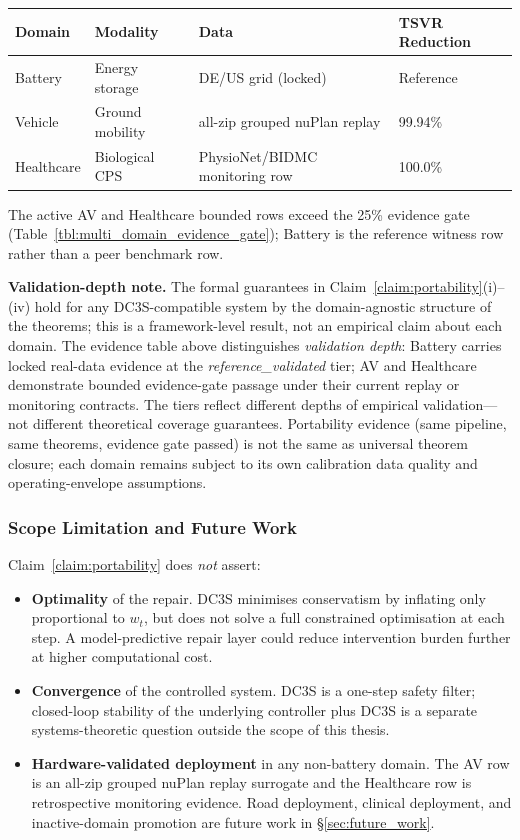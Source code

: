 \begin{center}
\begin{tabular}{llll}
\toprule
\textbf{Domain} & \textbf{Modality} & \textbf{Data} & \textbf{TSVR Reduction} \\
\midrule
Battery  & Energy storage & DE/US grid (locked) & Reference \\
Vehicle  & Ground mobility & all-zip grouped nuPlan replay & 99.94\% \\
Healthcare & Biological CPS & PhysioNet/BIDMC monitoring row & 100.0\% \\
\bottomrule
\end{tabular}
\end{center}

The active AV and Healthcare bounded rows exceed the 25\% evidence gate
(Table~\ref{tbl:multi_domain_evidence_gate}); Battery is the reference witness
row rather than a peer benchmark row.

\textbf{Validation-depth note.}
The formal guarantees in Claim~\ref{claim:portability}(i)--(iv) hold for any
DC3S-compatible system by the domain-agnostic structure of the theorems; this is
a framework-level result, not an empirical claim about each domain.
The evidence table above distinguishes \emph{validation depth}: Battery carries
locked real-data evidence at the \emph{reference\_validated} tier; AV and
Healthcare demonstrate bounded evidence-gate passage under their current replay
or monitoring contracts.  The tiers reflect different depths of empirical
validation---not different theoretical coverage guarantees.
Portability evidence (same pipeline, same theorems, evidence gate passed) is not
the same as universal theorem closure; each domain remains subject to its own
calibration data quality and operating-envelope assumptions.

\subsubsection*{Scope Limitation and Future Work}

Claim~\ref{claim:portability} does \emph{not} assert:
\begin{itemize}
  \item \textbf{Optimality} of the repair.  DC3S minimises conservatism by
        inflating only proportional to $w_t$, but does not solve a full
        constrained optimisation at each step.  A model-predictive repair
        layer could reduce intervention burden further at higher computational cost.
  \item \textbf{Convergence} of the controlled system.  DC3S is a one-step
        safety filter; closed-loop stability of the underlying controller plus
        DC3S is a separate systems-theoretic question outside the scope of this thesis.
  \item \textbf{Hardware-validated deployment} in any non-battery domain.
        The AV row is an all-zip grouped nuPlan replay surrogate and the
        Healthcare row is retrospective monitoring evidence.  Road deployment,
        clinical deployment, and inactive-domain promotion are future work in
        \S\ref{sec:future_work}.
\end{itemize}

